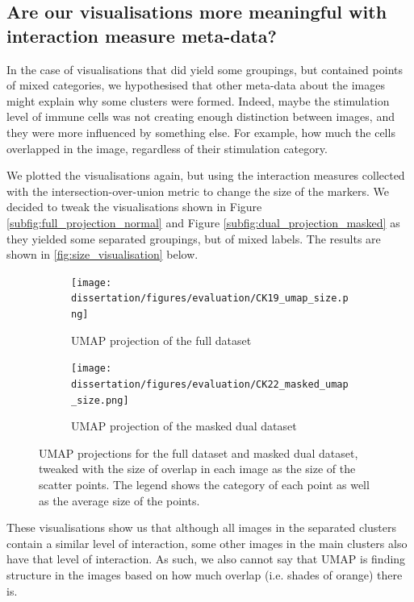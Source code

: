 \subsection{Are our visualisations more meaningful with interaction measure meta-data?}

In the case of visualisations that did yield some groupings, but contained points of mixed categories, we hypothesised that other meta-data about the images might explain why some clusters were formed. Indeed, maybe the stimulation level of immune cells was not creating enough distinction between images, and they were more influenced by something else. For example, how much the cells overlapped in the image, regardless of their stimulation category. 

We plotted the visualisations again, but using the interaction measures collected with the intersection-over-union metric to change the size of the markers. We decided to tweak the visualisations shown in Figure \ref{subfig:full_projection_normal} and Figure \ref{subfig:dual_projection_masked} as they yielded some separated groupings, but of mixed labels. The results are shown in \autoref{fig:size_visualisation} below. 

\begin{figure}[h!]
    \centering
    \begin{subfigure}{.45\textwidth}
        \texttt{[image: dissertation/figures/evaluation/CK19\_umap\_size.png]}
        \caption{UMAP projection of the full dataset}
    \end{subfigure}
    \begin{subfigure}{.45\textwidth}
        \texttt{[image: dissertation/figures/evaluation/CK22\_masked\_umap\_size.png]}
        \caption{UMAP projection of the masked dual dataset}
    \end{subfigure}
    \caption{UMAP projections for the full dataset and masked dual dataset, tweaked with the size of overlap in each image as the size of the scatter points. The legend shows the category of each point as well as the average size of the points.}
    \label{fig:size_visualisation}
\end{figure}

These visualisations show us that although all images in the separated clusters contain a similar level of interaction, some other images in the main clusters also have that level of interaction. As such, we also cannot say that UMAP is finding structure in the images based on how much overlap (i.e. shades of orange) there is.

